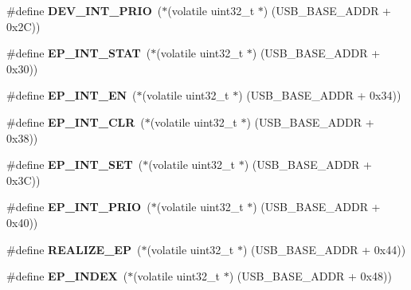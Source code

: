 \begin{DoxyCompactItemize}
\mbox{\label{group__lpc24xx__regs_gad9594a4fbfa0cec7b6af43f4fc3b51a9}} 
\#define {\bfseries D\+E\+V\+\_\+\+I\+N\+T\+\_\+\+P\+R\+IO}~($\ast$(volatile uint32\+\_\+t $\ast$) (U\+S\+B\+\_\+\+B\+A\+S\+E\+\_\+\+A\+D\+DR + 0x2\+C))
\item 
\mbox{\label{group__lpc24xx__regs_ga7ac92c467ebfcf341e70f9dc0240cb16}} 
\#define {\bfseries E\+P\+\_\+\+I\+N\+T\+\_\+\+S\+T\+AT}~($\ast$(volatile uint32\+\_\+t $\ast$) (U\+S\+B\+\_\+\+B\+A\+S\+E\+\_\+\+A\+D\+DR + 0x30))
\item 
\mbox{\label{group__lpc24xx__regs_ga3f936a37044781bd124826b4d7b1f5ac}} 
\#define {\bfseries E\+P\+\_\+\+I\+N\+T\+\_\+\+EN}~($\ast$(volatile uint32\+\_\+t $\ast$) (U\+S\+B\+\_\+\+B\+A\+S\+E\+\_\+\+A\+D\+DR + 0x34))
\item 
\mbox{\label{group__lpc24xx__regs_ga9999d0a30843fc88933c4cd1a347f8f0}} 
\#define {\bfseries E\+P\+\_\+\+I\+N\+T\+\_\+\+C\+LR}~($\ast$(volatile uint32\+\_\+t $\ast$) (U\+S\+B\+\_\+\+B\+A\+S\+E\+\_\+\+A\+D\+DR + 0x38))
\item 
\mbox{\label{group__lpc24xx__regs_ga8ea955904a86de84a896d3c1fc4a1e57}} 
\#define {\bfseries E\+P\+\_\+\+I\+N\+T\+\_\+\+S\+ET}~($\ast$(volatile uint32\+\_\+t $\ast$) (U\+S\+B\+\_\+\+B\+A\+S\+E\+\_\+\+A\+D\+DR + 0x3\+C))
\item 
\mbox{\label{group__lpc24xx__regs_ga6da4bab1ee8ba5ddaf10c251dc9903bc}} 
\#define {\bfseries E\+P\+\_\+\+I\+N\+T\+\_\+\+P\+R\+IO}~($\ast$(volatile uint32\+\_\+t $\ast$) (U\+S\+B\+\_\+\+B\+A\+S\+E\+\_\+\+A\+D\+DR + 0x40))
\item 
\mbox{\label{group__lpc24xx__regs_gaabc58a2521289512b17610c0dc885b03}} 
\#define {\bfseries R\+E\+A\+L\+I\+Z\+E\+\_\+\+EP}~($\ast$(volatile uint32\+\_\+t $\ast$) (U\+S\+B\+\_\+\+B\+A\+S\+E\+\_\+\+A\+D\+DR + 0x44))
\item 
\mbox{\label{group__lpc24xx__regs_ga1d97408bdaeec043c109be49e070f946}} 
\#define {\bfseries E\+P\+\_\+\+I\+N\+D\+EX}~($\ast$(volatile uint32\+\_\+t $\ast$) (U\+S\+B\+\_\+\+B\+A\+S\+E\+\_\+\+A\+D\+DR + 0x48))

\end{DoxyCompactItemize}
